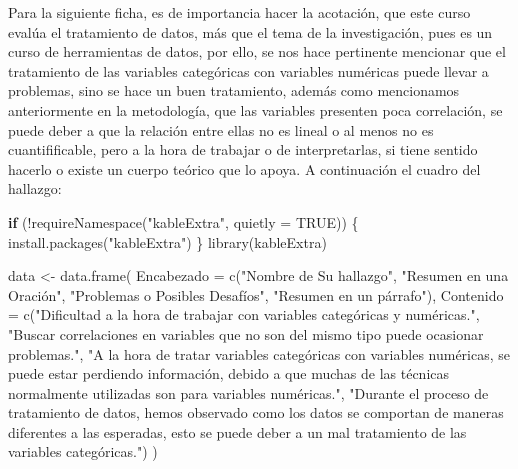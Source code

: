 \documentclass[
  letterpaper,
  DIV=11,
  numbers=noendperiod]{scrreprt}
\newenvironment{Shaded}{\begin{snugshade}}{\end{snugshade}}
\newcommand{\AttributeTok}[1]{\textcolor[rgb]{0.40,0.45,0.13}{#1}}
\newcommand{\ConstantTok}[1]{\textcolor[rgb]{0.56,0.35,0.01}{#1}}
\newcommand{\ControlFlowTok}[1]{\textcolor[rgb]{0.00,0.23,0.31}{\textbf{#1}}}
\newcommand{\FunctionTok}[1]{\textcolor[rgb]{0.28,0.35,0.67}{#1}}
\newcommand{\NormalTok}[1]{\textcolor[rgb]{0.00,0.23,0.31}{#1}}
\newcommand{\OtherTok}[1]{\textcolor[rgb]{0.00,0.23,0.31}{#1}}
\newcommand{\SpecialCharTok}[1]{\textcolor[rgb]{0.37,0.37,0.37}{#1}}
\newcommand{\StringTok}[1]{\textcolor[rgb]{0.13,0.47,0.30}{#1}}
\begin{document}
Para la siguiente ficha, es de importancia hacer la acotación, que este
curso evalúa el tratamiento de datos, más que el tema de la
investigación, pues es un curso de herramientas de datos, por ello, se
nos hace pertinente mencionar que el tratamiento de las variables
categóricas con variables numéricas puede llevar a problemas, sino se
hace un buen tratamiento, además como mencionamos anteriormente en la
metodología, que las variables presenten poca correlación, se puede
deber a que la relación entre ellas no es lineal o al menos no es
cuantifificable, pero a la hora de trabajar o de interpretarlas, si
tiene sentido hacerlo o existe un cuerpo teórico que lo apoya. A
continuación el cuadro del hallazgo:

\begin{Shaded}
\begin{Highlighting}[]
\ControlFlowTok{if}\NormalTok{ (}\SpecialCharTok{!}\FunctionTok{requireNamespace}\NormalTok{(}\StringTok{"kableExtra"}\NormalTok{, }\AttributeTok{quietly =} \ConstantTok{TRUE}\NormalTok{)) \{}
  \FunctionTok{install.packages}\NormalTok{(}\StringTok{"kableExtra"}\NormalTok{)}
\NormalTok{\}}
\FunctionTok{library}\NormalTok{(kableExtra)}


\NormalTok{data }\OtherTok{\textless{}{-}} \FunctionTok{data.frame}\NormalTok{(}
  \AttributeTok{Encabezado =} \FunctionTok{c}\NormalTok{(}\StringTok{"Nombre de Su hallazgo"}\NormalTok{, }
                 \StringTok{"Resumen en una Oración"}\NormalTok{, }
                 \StringTok{"Problemas o Posibles Desafíos"}\NormalTok{, }
                 \StringTok{"Resumen en un párrafo"}\NormalTok{),}
  \AttributeTok{Contenido =} \FunctionTok{c}\NormalTok{(}\StringTok{"Dificultad a la hora de trabajar con variables categóricas y numéricas."}\NormalTok{, }
                \StringTok{"Buscar correlaciones en variables que no son del mismo tipo puede ocasionar problemas."}\NormalTok{, }
                \StringTok{"A la hora de tratar variables categóricas con variables numéricas, se puede estar perdiendo información, debido a que muchas de las técnicas normalmente utilizadas son para variables numéricas."}\NormalTok{, }
                \StringTok{"Durante el proceso de tratamiento de datos, hemos observado como los datos se comportan de maneras diferentes a las esperadas, esto se puede deber a un mal tratamiento de las variables categóricas."}\NormalTok{)}
\NormalTok{)}



\end{Highlighting}
\end{Shaded}
\end{document}
